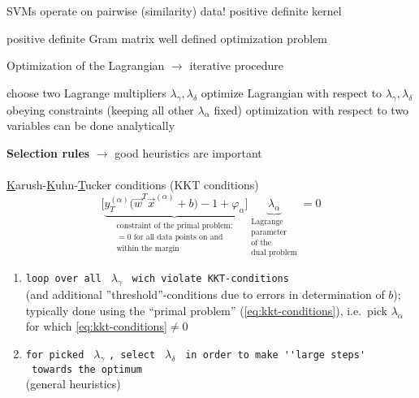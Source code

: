 \begin{itemize}
	\itR SVMs operate on pairwise (similarity) data!
	\itR positive definite kernel
	\begin{itemize}
		\itr positive definite Gram matrix
		\itr well defined optimization problem
	\end{itemize}
\end{itemize}
Optimization of the Lagrangian $\rightarrow$ iterative procedure
\begin{itemize}
	\itr choose two Lagrange multipliers $\lambda_\gamma, \lambda_\delta$
	\itr optimize Lagrangian with respect to $\lambda_\gamma, 
		\lambda_\delta$ obeying constraints (keeping all other 
		$\lambda_\alpha$ fixed)
	\itR optimization with respect to two variables can be done analytically
\end{itemize}
{\bf Selection rules} $\rightarrow$ good heuristics are important
\\\\
\underline{K}arush-\underline{K}uhn-\underline{T}ucker conditions (KKT conditions)
\begin{equation}\label{eq:kkt-conditions}
	\Big[ \underbrace{ y_T^{(\alpha)} \Big( \vec{w}^T \vec{x}^{(\alpha)} 
				+ b \Big) -1 + \varphi_\alpha }_{
			\substack{ \text{constraint of the primal problem:} \\
				= 0 \text{ for all data points on and} \\
				\text{within the margin}}}
	\Big] 
		\underbrace{ \lambda_\alpha }_{
			\substack{ \text{Lagrange} \\
				\text{parameter} \\
				\text{of the} \\
				\text{dual problem}}}
	= 0
\end{equation}
\begin{enumerate}
\item \verb|loop over all | $\lambda_\gamma$
      \verb| wich violate KKT-conditions|\\
      (and additional ''threshold''-conditions due to errors in
determination of $b$); typically done using the ``primal problem'' (\ref{eq:kkt-conditions}), i.e.\ pick $\lambda_\alpha$ for which \ref{eq:kkt-conditions}$\neq 0$
\item \verb|for picked | $\lambda_\gamma$ \verb|, select | $\lambda_\delta$
       \verb| in order to make ''large steps'|\\
       \verb| towards the optimum|\\
       (general heuristics)
\end{enumerate}


